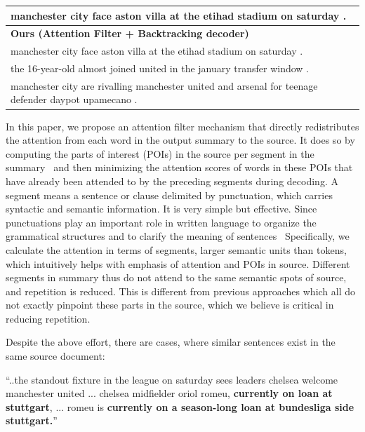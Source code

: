 \begin{table}[th!]
\begin{center}
\begin{tabular}{|l|}
       manchester city face aston villa at the etihad stadium on saturday . \\
\hline \bf Ours (Attention Filter + Backtracking decoder) \\
\hline manchester city face aston villa at the etihad stadium on saturday . \\
       the 16-year-old almost joined united in the january transfer window . \\
	   manchester city are rivalling manchester united and arsenal for teenage defender daypot upamecano .\\
\hline
\end{tabular}
\end{center}
\end{table}

In this paper, we propose an attention filter mechanism that directly 
redistributes the attention from each word in the output summary to the source. 
It does so by computing the parts of interest (POIs) in the source
per segment in the summary~
and then minimizing the attention scores of
words in these POIs that have already been attended to by the preceding 
segments during decoding. 
A segment means a sentence or clause delimited by punctuation,
which carries syntactic and semantic information. 
It is very simple but effective. Since punctuations 
play an important role in written language to organize 
the grammatical structures and to clarify the meaning of sentences~\citep{briscoe1996,Kim19,LiWE19}
Specifically, we calculate the attention in terms of segments, larger semantic units than tokens, 
which intuitively helps with emphasis of attention and POIs in source.
Different segments in summary thus do not attend to the same semantic spots
of source, and repetition is reduced. 
This is different from previous approaches
which all do not exactly pinpoint these parts in the source,
which we believe is critical in reducing repetition. 

Despite the above effort, there are cases, where similar sentences 
exist in the same source document:
\begin{example}
\label{ex:repeatsrc}
\small{``..the standout fixture in the league on saturday sees leaders 
	   chelsea welcome manchester united ... chelsea midfielder oriol romeu, 
\textbf{currently on loan at stuttgart}, ... romeu is 
\textbf{currently on a season-long loan at bundesliga side stuttgart.}''} 
\end{example}

